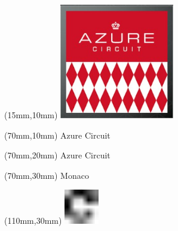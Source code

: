 \null\newpage
\begin{textblock*}{50mm}(15mm,10mm)%
\includegraphics[width=50mm]{LG/2015-05-20_00072.png}
\end{textblock*}
\begin{textblock*}{130mm}(70mm,10mm)%
{\fontsize{20}{20}\selectfont Azure Circuit}\\
\end{textblock*}
\begin{textblock*}{120mm}(70mm,20mm)%
{\fontsize{16}{16}\selectfont Azure Circuit}\\
\end{textblock*}
\begin{textblock*}{120mm}(70mm,30mm)%
{\fontsize{12}{12}\selectfont Monaco}
\end{textblock*}
\begin{textblock*}{30mm}(110mm,30mm)%
\centering
\includegraphics[height=15mm]{icons/fa-rotate-right.pdf}
\end{textblock*}
